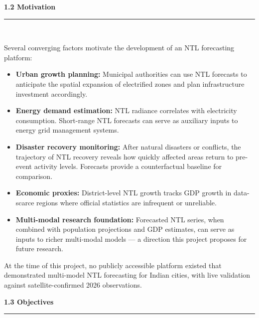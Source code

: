 \documentclass[12pt,a4paper]{report}
\begin{document}
\vspace{0.5cm}
\begin{center}
    \hypertarget{sec:s12}{}%
    {\large \textbf{1.2 Motivation}}\\[0.3cm]
    \noindent\rule{\linewidth}{0.4pt}\\[0.5cm]
\end{center}

Several converging factors motivate the development of an NTL forecasting platform:

\begin{itemize}[leftmargin=1.5cm]
    \item \textbf{Urban growth planning:} Municipal authorities can use NTL forecasts to anticipate the spatial expansion of electrified zones and plan infrastructure investment accordingly.
    \item \textbf{Energy demand estimation:} NTL radiance correlates with electricity consumption. Short-range NTL forecasts can serve as auxiliary inputs to energy grid management systems.
    \item \textbf{Disaster recovery monitoring:} After natural disasters or conflicts, the trajectory of NTL recovery reveals how quickly affected areas return to pre-event activity levels. Forecasts provide a counterfactual baseline for comparison.
    \item \textbf{Economic proxies:} District-level NTL growth tracks GDP growth in data-scarce regions where official statistics are infrequent or unreliable.
    \item \textbf{Multi-modal research foundation:} Forecasted NTL series, when combined with population projections and GDP estimates, can serve as inputs to richer multi-modal models --- a direction this project proposes for future research.
\end{itemize}

At the time of this project, no publicly accessible platform existed that demonstrated multi-model NTL forecasting for Indian cities, with live validation against satellite-confirmed 2026 observations.

\vspace{0.5cm}
\begin{center}
    \hypertarget{sec:s13}{}%
    {\large \textbf{1.3 Objectives}}\\[0.3cm]
    \noindent\rule{\linewidth}{0.4pt}\\[0.5cm]
\end{center}
\end{document}
